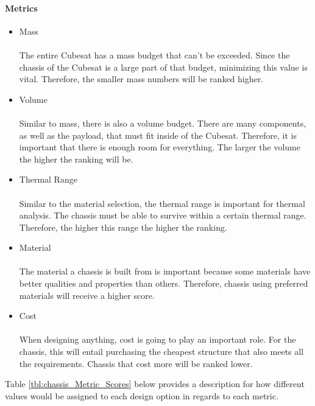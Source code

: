 \documentclass{ece}
\begin{document}
\paragraph{Metrics}
\begin{itemize}
\item{Mass}\\
\\
The entire Cubesat has a mass budget that can't be exceeded. Since the chassis of the Cubesat is a large part of that budget, minimizing this value is vital. Therefore, the smaller mass numbers will be ranked higher. 
\item{Volume}\\
\\
Similar to mass, there is also a volume budget. There are many components, as well as the payload, that must fit inside of the Cubesat. Therefore, it is important that there is enough room for everything. The larger the volume the higher the ranking will be.
\item{Thermal Range}\\
\\
Similar to the material selection, the thermal range is important for thermal analysis. The chassis must be able to survive within a certain thermal range. Therefore, the higher this range the higher the ranking.
\item{Material}\\
\\
The material a chassis is built from is important because some materials have better qualities and properties than others. Therefore, chassis using preferred materials will receive a higher score. 
\item{Cost}\\
\\
When designing anything, cost is going to play an important role. For the chassis, this will entail purchasing the cheapest structure that also meets all the requirements. Chassis that cost more will be ranked lower.
\end{itemize}

Table \ref{tbl:chassis_Metric_Scores} below provides a description for how different values would be assigned to each design option in regards to each metric. 
\end{document}
